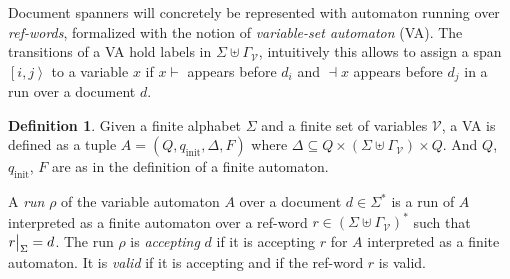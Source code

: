 \documentclass[11px]{article}
\theoremstyle{definition}
\newtheorem{definition}{Definition}
\newcommand{\Span}[1]{\left[ #1 \right\rangle}
\newcommand\restr[2]{{%
  \left.\kern-\nulldelimiterspace %
  #1 %
  \vphantom{\big|} %
  \right|_{#2} %
  }}
\begin{document}

        Document spanners will concretely be represented with automaton running
        over \textit{ref-words}, formalized with the notion of
        \textit{variable-set automaton} (VA). The transitions of a VA hold
        labels in $\Sigma \uplus \Gamma_\mathcal{V}$, intuitively this allows
        to assign a span $\Span{i, j}$ to a variable $x$ if $x{\vdash}$ appears
        before $d_i$ and ${\dashv}x$ appears before $d_j$ in a run over a
        document $d$.

        \begin{definition}
          Given a finite alphabet $\Sigma$ and a finite set of variables
          $\mathcal{V}$, a VA is defined as a tuple $A = (Q, q_\text{init},
          \Delta, F)$ where $\Delta \subseteq Q \times (\Sigma \uplus
          \Gamma_\mathcal{V}) \times Q$. And $Q$, $q_\text{init}$, $F$ are as
          in the definition of a finite automaton.


          A \textit{run} $\rho$ of the variable automaton $A$ over a document
          $d \in \Sigma^*$ is a run of $A$ interpreted as a finite automaton
          over a ref-word $r \in {(\Sigma \uplus \Gamma_\mathcal{V})}^*$ such
          that $\restr{r}{\Sigma} = d$. The run $\rho$ is \textit{accepting}
          $d$ if it is accepting $r$ for $A$ interpreted as a finite automaton.
          It is \textit{valid} if it is accepting and if the ref-word $r$ is
          valid.
        \end{definition}

\end{document}
